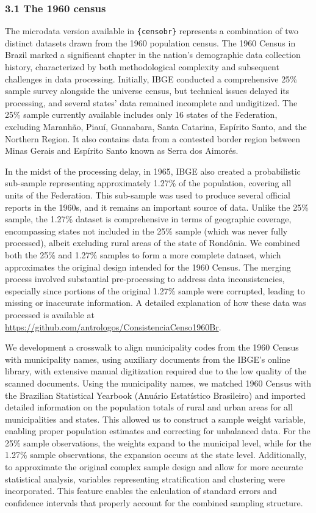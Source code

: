 \documentclass[
]{article}
\begin{document}
\subsubsection{3.1 The 1960 census}\label{the-1960-census}

The microdata version available in \texttt{\{censobr\}} represents a
combination of two distinct datasets drawn from the 1960 population
census. The 1960 Census in Brazil marked a significant chapter in the
nation's demographic data collection history, characterized by both
methodological complexity and subsequent challenges in data processing.
Initially, IBGE conducted a comprehensive 25\% sample survey alongside
the universe census, but technical issues delayed its processing, and
several states' data remained incomplete and undigitized. The 25\%
sample currently available includes only 16 states of the Federation,
excluding Maranhão, Piauí, Guanabara, Santa Catarina, Espírito Santo,
and the Northern Region. It also contains data from a contested border
region between Minas Gerais and Espírito Santo known as Serra dos
Aimorés.

In the midst of the processing delay, in 1965, IBGE also created a
probabilistic sub-sample representing approximately 1.27\% of the
population, covering all units of the Federation. This sub-sample was
used to produce several official reports in the 1960s, and it remains an
important source of data. Unlike the 25\% sample, the 1.27\% dataset is
comprehensive in terms of geographic coverage, encompassing states not
included in the 25\% sample (which was never fully processed), albeit
excluding rural areas of the state of Rondônia. We combined both the
25\% and 1.27\% samples to form a more complete dataset, which
approximates the original design intended for the 1960 Census. The
merging process involved substantial pre-processing to address data
inconsistencies, especially since portions of the original 1.27\% sample
were corrupted, leading to missing or inaccurate information. A detailed
explanation of how these data was processed is available at
\url{https://github.com/antrologos/ConsistenciaCenso1960Br}.

We development a crosswalk to align municipality codes from the 1960
Census with municipality names, using auxiliary documents from the
IBGE's online library, with extensive manual digitization required due
to the low quality of the scanned documents. Using the municipality
names, we matched 1960 Census with the Brazilian Statistical Yearbook
(Anuário Estatístico Brasileiro) and imported detailed information on
the population totals of rural and urban areas for all municipalities
and states. This allowed us to construct a sample weight variable,
enabling proper population estimates and correcting for unbalanced data.
For the 25\% sample observations, the weights expand to the municipal
level, while for the 1.27\% sample observations, the expansion occurs at
the state level. Additionally, to approximate the original complex
sample design and allow for more accurate statistical analysis,
variables representing stratification and clustering were incorporated.
This feature enables the calculation of standard errors and confidence
intervals that properly account for the combined sampling structure.
\end{document}

